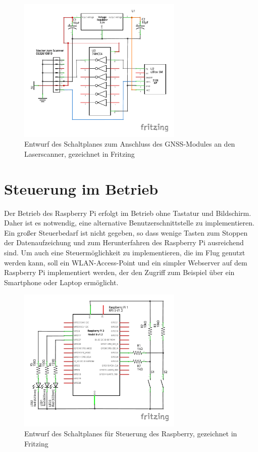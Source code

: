 \documentclass[a4paper,12pt,bibliography=totoc, listof=totoc,titlepage,pointlessnumbers]{scrreprt}
\begin{document}
\begin{figure}
 \centering
 \includegraphics[width=0.7\textwidth]{img/GPS_Schaltung.pdf}
 \caption{Entwurf des Schaltplanes zum Anschluss des GNSS-Modules an den Laserscanner, gezeichnet in Fritzing}
 \label{abb:schaltplan}
\end{figure}

\section{Steuerung im Betrieb}
\label{s:steuermodul}
Der Betrieb des Raspberry Pi erfolgt im Betrieb ohne Tastatur und Bildschirm. Daher ist es notwendig, eine alternative Benutzerschnittstelle zu implementieren. Ein großer Steuerbedarf ist nicht gegeben, so dass wenige Tasten zum Stoppen der Datenaufzeichung und zum Herunterfahren des Raspberry Pi ausreichend sind. Um auch eine Steuermöglichkeit zu implementieren, die im Flug genutzt werden kann, soll ein WLAN-Access-Point und ein simpler Webserver auf dem Raspberry Pi implementiert werden, der den Zugriff zum Beispiel über ein Smartphone oder Laptop ermöglicht.

\begin{figure}
 \centering
 \includegraphics[width=0.7\textwidth]{img/steuerung.pdf}
 \caption{Entwurf des Schaltplanes für Steuerung des Raspberry, gezeichnet in Fritzing}
 \label{abb:steuerung}
\end{figure}
\end{document}
